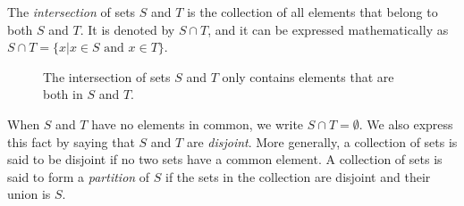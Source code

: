 The \emph{intersection} of sets $S$ and $T$ is the collection of all elements that belong to both $S$ and $T$.
It is denoted by $S \cap T$, and it can be expressed mathematically as $S \cap T = \{ x | x \in S \text{ and } x \in T \}$.

\begin{figure}[htb!]
\begin{center}
\caption{The intersection of sets $S$ and $T$ only contains elements that are both in $S$ and $T$.}
\end{center}
\end{figure}

When $S$ and $T$ have no elements in common, we write $S \cap T = \emptyset$.
We also express this fact by saying that $S$ and $T$ are \emph{disjoint}.
More generally, a collection of sets is said to be disjoint if no two sets have a common element.
A collection of sets is said to form a \emph{partition} of $S$ if the sets in the collection are disjoint and their union is $S$.

